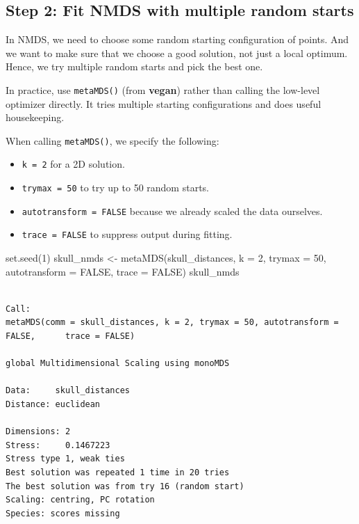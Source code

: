\documentclass[
  letterpaper,
  8pt,
  a4paper]{book}
\newenvironment{Shaded}{\begin{snugshade}}{\end{snugshade}}
\newcommand{\AttributeTok}[1]{\textcolor[rgb]{0.40,0.45,0.13}{#1}}
\newcommand{\ConstantTok}[1]{\textcolor[rgb]{0.56,0.35,0.01}{#1}}
\newcommand{\DecValTok}[1]{\textcolor[rgb]{0.68,0.00,0.00}{#1}}
\newcommand{\FunctionTok}[1]{\textcolor[rgb]{0.28,0.35,0.67}{#1}}
\newcommand{\NormalTok}[1]{\textcolor[rgb]{0.00,0.23,0.31}{#1}}
\newcommand{\OtherTok}[1]{\textcolor[rgb]{0.00,0.23,0.31}{#1}}
\providecommand{\tightlist}{%
  \setlength{\itemsep}{0pt}\setlength{\parskip}{0pt}}
\begin{document}
\subsection*{Step 2: Fit NMDS with multiple random
starts}\label{step-2-fit-nmds-with-multiple-random-starts}

In NMDS, we need to choose some random starting configuration of points.
And we want to make sure that we choose a good solution, not just a
local optimum. Hence, we try multiple random starts and pick the best
one.

In practice, use \texttt{metaMDS()} (from \textbf{vegan}) rather than
calling the low-level optimizer directly. It tries multiple starting
configurations and does useful housekeeping.

When calling \texttt{metaMDS()}, we specify the following:

\begin{itemize}
\tightlist
\item
  \texttt{k\ =\ 2} for a 2D solution.
\item
  \texttt{trymax\ =\ 50} to try up to 50 random starts.
\item
  \texttt{autotransform\ =\ FALSE} because we already scaled the data
  ourselves.
\item
  \texttt{trace\ =\ FALSE} to suppress output during fitting.
\end{itemize}

\begin{Shaded}
\begin{Highlighting}[]
\FunctionTok{set.seed}\NormalTok{(}\DecValTok{1}\NormalTok{)}
\NormalTok{skull\_nmds }\OtherTok{\textless{}{-}} \FunctionTok{metaMDS}\NormalTok{(skull\_distances, }\AttributeTok{k =} \DecValTok{2}\NormalTok{, }\AttributeTok{trymax =} \DecValTok{50}\NormalTok{, }\AttributeTok{autotransform =} \ConstantTok{FALSE}\NormalTok{, }\AttributeTok{trace =} \ConstantTok{FALSE}\NormalTok{)}
\NormalTok{skull\_nmds}
\end{Highlighting}
\end{Shaded}

\begin{verbatim}

Call:
metaMDS(comm = skull_distances, k = 2, trymax = 50, autotransform = FALSE,      trace = FALSE) 

global Multidimensional Scaling using monoMDS

Data:     skull_distances 
Distance: euclidean 

Dimensions: 2 
Stress:     0.1467223 
Stress type 1, weak ties
Best solution was repeated 1 time in 20 tries
The best solution was from try 16 (random start)
Scaling: centring, PC rotation 
Species: scores missing
\end{verbatim}
\end{document}
